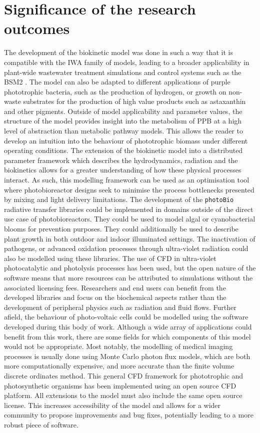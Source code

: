 \section{Significance of the research outcomes}
The development of the biokinetic model was done in such a way that it is compatible with the IWA family of models, leading to a broader applicability in plant-wide wastewater treatment simulations and control systems such as the BSM2 \cite{jeppsson2007}. The model can also be adapted to different applications of purple phototrophic bacteria, such as the production of hydrogen, or growth on non-waste substrates for the production of high value products such as astaxanthin and other pigments. Outside of model applicability and parameter values, the structure of the model provides insight into the metabolism of PPB at a high level of abstraction than metabolic pathway models. This allows the reader to develop an intuition into the behaviour of phototrophic biomass under different operating conditions. 
\skippingparagraph
The extension of the biokinetic model into a distributed parameter framework which describes the hydrodynamics, radiation and the biokinetics allows for a greater understanding of how these physical processes interact. As such, this modelling framework can be used as an optimisation tool where photobioreactor designs seek to minimise the process bottlenecks presented by mixing and light delivery limitations. The development of the \texttt{photoBio} radiative transfer libraries could be implemented in domains outside of the direct use case of photobioreactors. They could be used to model algal or cyanobacterial blooms for prevention purposes. They could additionally be used to describe plant growth in both outdoor and indoor illuminated settings. The inactivation of pathogens, or advanced oxidation processes through ultra-violet radiation could also be modelled using these libraries. The use of CFD in ultra-violet photocatalytic and photolysis processes has been used, but the open nature of the software means that more resources can be attributed to simulations without the associated licensing fees. Researchers and end users can benefit from the developed libraries and focus on the biochemical aspects rather than the development of peripheral physics such as radiation and fluid flows. Further afield, the behaviour of photo-voltaic cells could be modelled using the software developed during this body of work. Although a wide array of applications could benefit from this work, there are some fields for which components of this model would not be appropriate. Most notably, the modelling of medical imaging processes is usually done using Monte Carlo photon flux models, which are both more computationally expensive, and more accurate than the finite volume discrete ordinates method.
\skippingparagraph
This general CFD framework for phototrophic and photosynthetic organisms has been implemented using an open source CFD platform. All extensions to the model must also include the same open source license. This increases accessibility of the model and allows for a wider community to propose improvements and bug fixes, potentially leading to a more robust piece of software. 

